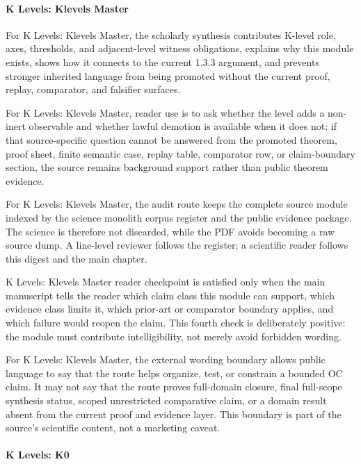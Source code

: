 \paragraph{K Levels: Klevels Master}

For K Levels: Klevels Master, the scholarly synthesis contributes K-level role, axes, thresholds, and adjacent-level witness obligations, explains why this module exists, shows how it connects to the current 1.3.3 argument, and prevents stronger inherited language from being promoted without the current proof, replay, comparator, and falsifier surfaces.


For K Levels: Klevels Master, reader use is to ask whether the level adds a non-inert observable and whether lawful demotion is available when it does not; if that source-specific question cannot be answered from the promoted theorem, proof sheet, finite semantic case, replay table, comparator row, or claim-boundary section, the source remains background support rather than public theorem evidence.


For K Levels: Klevels Master, the audit route keeps the complete source module indexed by the science monolith corpus register and the public evidence package. The science is therefore not discarded, while the PDF avoids becoming a raw source dump. A line-level reviewer follows the register; a scientific reader follows this digest and the main chapter.


K Levels: Klevels Master reader checkpoint is satisfied only when the main manuscript tells the reader which claim class this module can support, which evidence class limits it, which prior-art or comparator boundary applies, and which failure would reopen the claim. This fourth check is deliberately positive: the module must contribute intelligibility, not merely avoid forbidden wording.


For K Levels: Klevels Master, the external wording boundary allows public language to say that the route helps organize, test, or constrain a bounded OC claim. It may not say that the route proves full-domain closure, final full-scope synthesis status, scoped unrestricted comparative claim, or a domain result absent from the current proof and evidence layer. This boundary is part of the source's scientific content, not a marketing caveat.


\paragraph{K Levels: K0}


